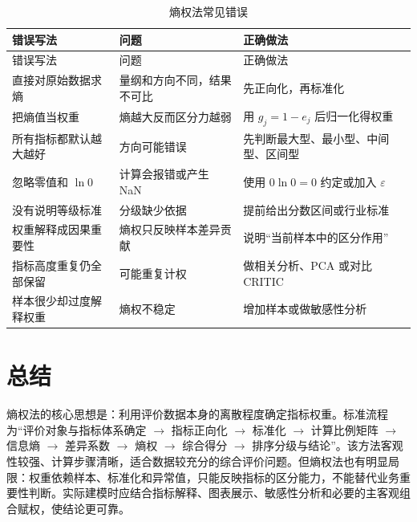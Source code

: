 \documentclass[UTF8,a4paper,12pt]{ctexart}
\begin{document}
\begin{longtable}{p{4.0cm}p{5.0cm}p{5.4cm}}
\caption{熵权法常见错误}\label{tab:mistakes}\\
\toprule
错误写法 & 问题 & 正确做法\\
\midrule
\endfirsthead
\toprule
错误写法 & 问题 & 正确做法\\
\midrule
\endhead
直接对原始数据求熵 & 量纲和方向不同，结果不可比 & 先正向化，再标准化\\
把熵值当权重 & 熵越大反而区分力越弱 & 用 $g_j=1-e_j$ 后归一化得权重\\
所有指标都默认越大越好 & 方向可能错误 & 先判断最大型、最小型、中间型、区间型\\
忽略零值和 $\ln 0$ & 计算会报错或产生 NaN & 使用 $0\ln0=0$ 约定或加入 $\varepsilon$\\
没有说明等级标准 & 分级缺少依据 & 提前给出分数区间或行业标准\\
权重解释成因果重要性 & 熵权只反映样本差异贡献 & 说明“当前样本中的区分作用”\\
指标高度重复仍全部保留 & 可能重复计权 & 做相关分析、PCA 或对比 CRITIC\\
样本很少却过度解释权重 & 熵权不稳定 & 增加样本或做敏感性分析\\
\bottomrule
\end{longtable}

\section{总结}

熵权法的核心思想是：利用评价数据本身的离散程度确定指标权重。标准流程为“评价对象与指标体系确定 $\rightarrow$ 指标正向化 $\rightarrow$ 标准化 $\rightarrow$ 计算比例矩阵 $\rightarrow$ 信息熵 $\rightarrow$ 差异系数 $\rightarrow$ 熵权 $\rightarrow$ 综合得分 $\rightarrow$ 排序分级与结论”。该方法客观性较强、计算步骤清晰，适合数据较充分的综合评价问题。但熵权法也有明显局限：权重依赖样本、标准化和异常值，只能反映指标的区分能力，不能替代业务重要性判断。实际建模时应结合指标解释、图表展示、敏感性分析和必要的主客观组合赋权，使结论更可靠。

\newpage
\end{document}

